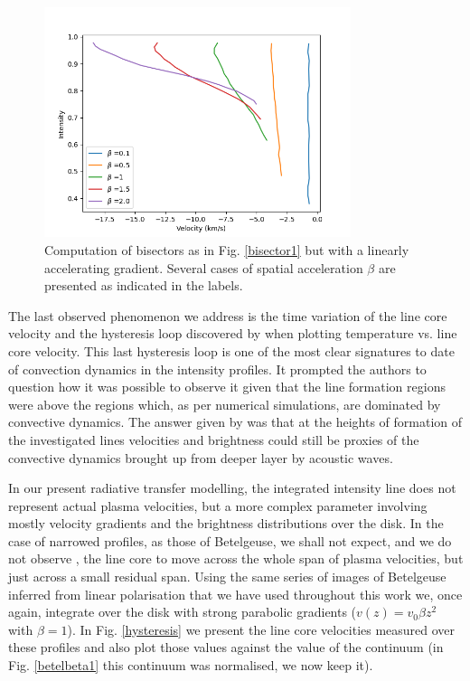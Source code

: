 \documentclass{/Users/art2/TeX/aanda/aa}
\begin{document}
\begin{figure}
   \includegraphics[width=0.8\textwidth]{Fig10_art74.png}
   \caption{Computation of bisectors as in Fig. \ref{bisector1} but with a linearly accelerating gradient. Several cases of  spatial acceleration $\beta$ 
   are presented as indicated in the labels.}
   \label{bisector2}
   \end{figure}

The last observed phenomenon we address is the time variation of the line core velocity and the hysteresis loop discovered by 
\cite{kravchenko_tomography_2019} when plotting temperature vs. line core velocity. This last hysteresis loop is one of the most clear signatures 
to date of convection dynamics in the intensity profiles. It prompted the authors to question how it was possible to observe it given that the 
line formation regions were above the regions which, as per numerical simulations, are dominated by convective dynamics. The answer given by \cite{kravchenko_tomography_2019} was that at the heights of formation of the investigated lines velocities and brightness could still be 
proxies of the convective dynamics brought up from deeper layer by acoustic waves. 

In our present radiative transfer modelling, the integrated intensity line does not represent actual plasma velocities, but a more complex parameter 
involving mostly velocity gradients and the brightness distributions over the disk. In the case of narrowed profiles, as those of Betelgeuse, we shall 
not expect, and we do not observe , the line core to move across the whole span of plasma velocities, but just across a small residual span. Using the 
same series of images of Betelgeuse inferred from linear polarisation that we have used throughout this work \citep{auriere_discovery_2016} we, once 
again, integrate over the disk with strong parabolic gradients ($v(z)=v_0\beta z^2$ with $\beta=1$). In Fig. \ref{hysteresis} we present the line core velocities measured over these 
profiles and also plot those values against the value of the continuum (in Fig. \ref{betelbeta1} this continuum was normalised, we now keep it).
\end{document}
